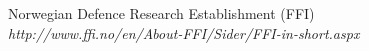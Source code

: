 \section *  {}

\begin{thebibliography}{9}


             Norwegian Defence Research Establishment (FFI) \\ 
\textit{http://www.ffi.no/en/About-FFI/Sider/FFI-in-short.aspx}


\end{thebibliography}






